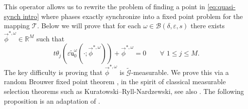 \documentclass[a4paper,10pt,reqno]{article}
\theoremstyle{definition}
\theoremstyle{plain}
\theoremstyle{plain}
\theoremstyle{definition}
\theoremstyle{plain}
\theoremstyle{plain}
\theoremstyle{plain}
\theoremstyle{definition}
\theoremstyle{definition}
\def \R{\mathbb R}
\def \tu{\mathtt{u}}
\begin{document}
This operator allows us to rewrite the problem of finding a point in \eqref{eq:quasi-synch intro} where phases exactly synchronize into a fixed point problem for the mapping $\mathcal{T}$. Below we will prove that for each $\omega\in\mathcal{B}(\delta,\varepsilon,s)$ there exists 
$\vec{\phi}^{*,\omega} \in \R^M$ such that 
\[
t \theta_j(\varepsilon \widetilde{\tu}_0^{\omega}(\cdot ; \vec{\phi}^{*,\omega})) + \vec{\phi}^{*,\omega} = 0 \qquad \forall \, \, 1 \le j \le M.
\]
The key difficulty is proving that $\vec{\phi}^{*,\omega}$ is $\widetilde{\mathcal{G}}$-measurable. We prove this via a random Brouwer fixed point theorem \cite{fixed point}, in the spirit of classical measurable selection theorems such as Kuratowski–Ryll-Nardzewski, see also \cite[Chapter~3.2]{measurable selection}.
The following proposition is an adaptation of \cite[Proposition 5.3]{bertimasperograndestaffilani}. 
\end{document}
